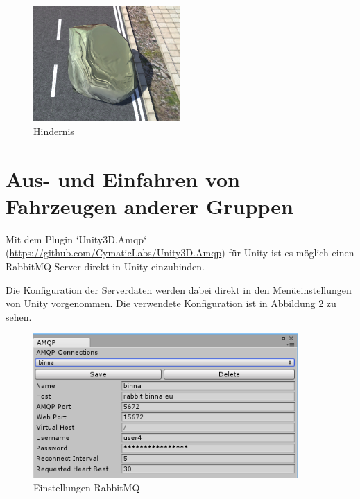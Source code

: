 \begin{figure}[H]
\begin{center}
\includegraphics[width=0.5\textwidth]{BilderAllgemein/rock.PNG}
\end{center}
	\caption{Hindernis}
	\label{img:hindernis}
\end{figure}

\section{Aus- und Einfahren von Fahrzeugen anderer Gruppen}
\label{Aus-_und_Einfahren_von_Fahrzeugen_anderer_Gruppen}

Mit dem Plugin `Unity3D.Amqp` (\url{https://github.com/CymaticLabs/Unity3D.Amqp}) für Unity ist es möglich einen RabbitMQ-Server direkt in Unity einzubinden.

Die Konfiguration der Serverdaten werden dabei direkt in den Menüeinstellungen von Unity vorgenommen. Die verwendete Konfiguration ist in Abbildung \ref{img:rabbit} zu sehen.

\begin{figure}[H]
\begin{center}
	\includegraphics[width=0.9\textwidth]{BilderAllgemein/rabbitconfig.png}
\end{center}

	\caption{Einstellungen RabbitMQ}

	\label{img:rabbit}
\end{figure}

